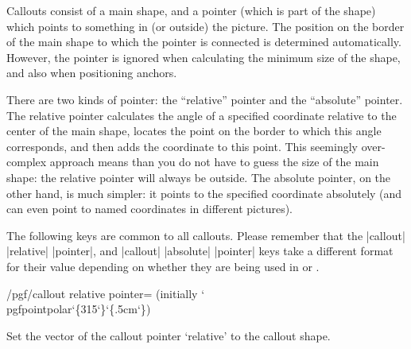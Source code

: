 Callouts consist of a 
main shape, and a pointer (which is part of the shape) which points
to something in (or outside) the picture. The position on the border
of the main shape to which the pointer is connected is determined
automatically. However, the pointer is ignored when calculating the 
minimum size of the shape, and also when positioning anchors.

\begin{codeexample}[]
\end{codeexample}

There are two kinds of pointer:	the ``relative'' pointer and the 
``absolute'' pointer.	The relative pointer calculates the angle of a
specified coordinate relative to the center of the main shape, locates 
the point on the border to which this angle corresponds, and then adds 
the coordinate to this point. This seemingly over-complex approach 
means than you do not have to guess the size of the main shape: the 
relative pointer will always be outside. 
The absolute pointer, on the 
other hand, is much simpler: it points to the specified coordinate
absolutely (and can even point to named coordinates in different 
pictures).


\begin{codeexample}[]
\end{codeexample}


The following keys are common to all callouts. Please remember
that the |callout| |relative| |pointer|, and |callout| |absolute|
|pointer| keys take a different format for their value depending 
on whether they are being used in \pgfname{} or \tikzname{}.
  
  
\begin{key}{/pgf/callout relative pointer= (initially {\ttfamily\char`\\pgfpointpolar\char`\{315\char`\}\char`\{.5cm\char`\}})}
  
  Set the vector of the callout pointer `relative' to the callout 
  shape. 
  
\end{key}

